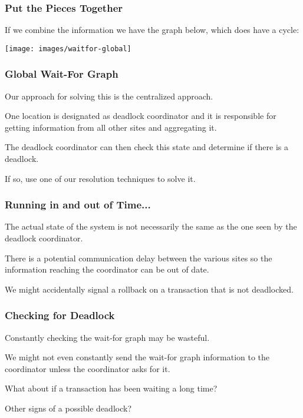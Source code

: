 \begin{frame}
\frametitle{Put the Pieces Together}

If we combine the information we have the graph below, which does have a cycle:

\begin{center}
\texttt{[image: images/waitfor-global]}
\end{center}


\end{frame}

\begin{frame}
\frametitle{Global Wait-For Graph}

Our approach for solving this is the centralized approach.

One location is designated as deadlock coordinator and it is responsible for getting information from all other sites and aggregating it. 

The deadlock coordinator can then check this state and determine if there is a deadlock.

If so, use one of our resolution techniques to solve it.

\end{frame}

\begin{frame}
\frametitle{Running in and out of Time...}

The actual state of the system is not necessarily the same as the one seen by the deadlock coordinator. 

There is a potential communication delay between the various sites so the information reaching the coordinator can be out of date.

We might accidentally signal a rollback on a transaction that is not deadlocked.


\end{frame}

\begin{frame}
\frametitle{Checking for Deadlock}

Constantly checking the wait-for graph may be wasteful.

We might not even constantly send the wait-for graph information to the coordinator unless the coordinator asks for it.

What about if a transaction has been waiting a long time?

Other signs of a possible deadlock?

\end{frame}


